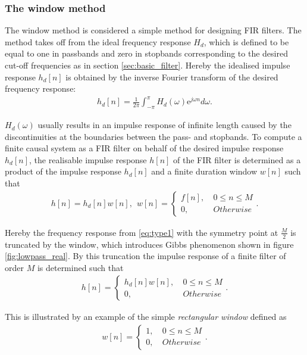 \subsubsection{The window method}
The window method is considered a simple method for designing FIR filters. The method takes off from the ideal frequency response $H_d$, which is defined to be equal to one in passbands and zero in stopbands corresponding to the desired cut-off frequencies as in section \ref{sec:basic_filter}. Hereby the idealised impulse response $h_d[n]$ is obtained by the inverse Fourier transform of the desired frequency response:
\begin{align*}
h_d[n]=\frac{1}{2\pi}\int_{-\pi}^{\pi} H_d(\omega)\text{e}^{j\omega n} d\omega.
\end{align*}

$H_d(\omega)$ usually results in an impulse response of infinite length caused by the discontinuities at the boundaries between the pass- and stopbands. To compute a finite causal system as a FIR filter on behalf of the desired impulse response $h_d[n]$, the realisable impulse response $h[n]$ of the FIR filter is determined as a product of the impulse response $h_d[n]$ and a finite duration window $w[n]$ such that
\begin{align*}
h[n]=h_d[n]w[n], \ \ w[n] =
\begin{cases}
f[n], &\ 0 \leq n \leq M \\
0, &\ Otherwise
\end{cases}.
\end{align*}

Hereby the frequency response from \eqref{eq:type1} with the symmetry point at $\frac{M}{2}$ is truncated by the window, which introduces Gibbs phenomenon shown in figure \ref{fig:lowpass_real}. By this truncation the impulse response of a finite filter of order $M$ is determined such that
\begin{align*}
h[n]= 
\begin{cases}
h_d[n]w[n], &\ 0 \leq n \leq M \\
0, &\ Otherwise
\end{cases}.
\end{align*}

This is illustrated by an example of the simple \textit{rectangular window} defined as 
\begin{align*}
w[n] =
\begin{cases}
1, &\ 0 \leq n \leq M \\
0, &\ Otherwise
\end{cases}.
\end{align*}

